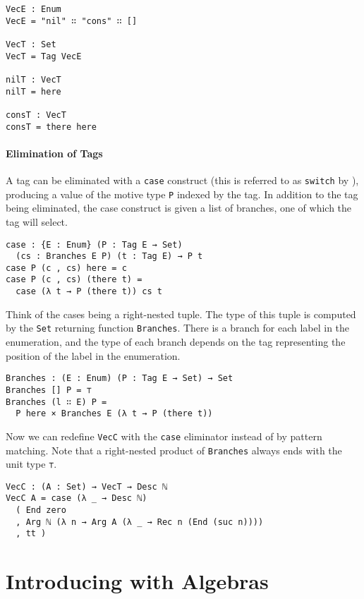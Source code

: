 \documentclass[preprint,nonatbib]{sigplanconf}
\begin{document}
\begin{verbatim}
VecE : Enum
VecE = "nil" ∷ "cons" ∷ []

VecT : Set
VecT = Tag VecE

nilT : VecT
nilT = here

consT : VecT
consT = there here
\end{verbatim}

\paragraph{Elimination of Tags}

A tag can be eliminated with a {\tt case} construct (this is referred to
as {\tt switch} by \citet{Chapman:2010:GAL:1932681.1863547,dagand:phd}),
producing a value of the motive type {\tt P} indexed by the tag.
In addition to the tag being eliminated, the case construct is given a
list of branches, one of which the tag will select.

\begin{verbatim}
case : {E : Enum} (P : Tag E → Set)
  (cs : Branches E P) (t : Tag E) → P t
case P (c , cs) here = c
case P (c , cs) (there t) =
  case (λ t → P (there t)) cs t
\end{verbatim}

Think of the cases being a right-nested tuple. The type of this tuple
is computed by the {\tt Set} returning function {\tt Branches}.
There is a branch for each label in the enumeration, and the type of
each branch depends on the tag representing the position of the label
in the enumeration.

\begin{verbatim}
Branches : (E : Enum) (P : Tag E → Set) → Set
Branches [] P = ⊤
Branches (l ∷ E) P =
  P here × Branches E (λ t → P (there t))
\end{verbatim}

Now we can redefine {\tt VecC} with the {\tt case} eliminator instead
of by pattern matching. Note that a right-nested product of
{\tt Branches} always ends with the unit type {\tt ⊤}.

\begin{verbatim}
VecC : (A : Set) → VecT → Desc ℕ
VecC A = case (λ _ → Desc ℕ)
  ( End zero
  , Arg ℕ (λ n → Arg A (λ _ → Rec n (End (suc n))))
  , tt )
\end{verbatim}

\section{Introducing with Algebras}
\label{sec:init}
\end{document}
